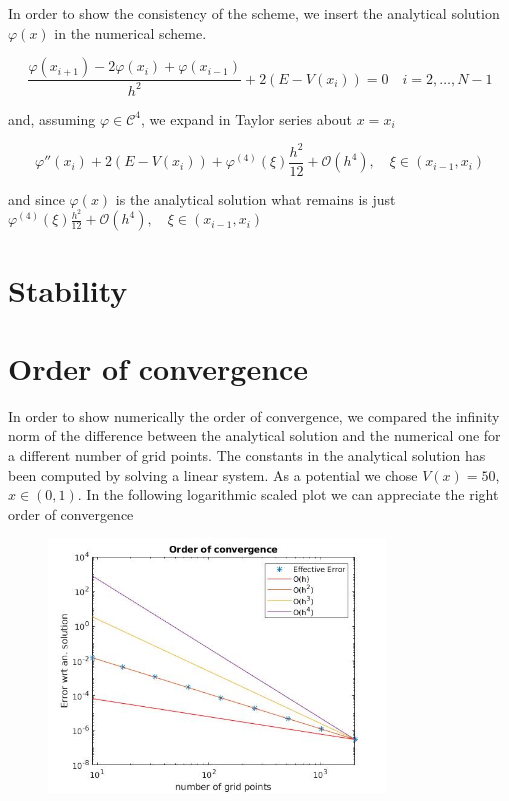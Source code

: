 \documentclass[a4paper,oneside]{book}
\theoremstyle{definition}
\theoremstyle{plain}
\newcommand{\var}{\varphi}
\begin{document}
In order to show the consistency of the scheme, we insert the analytical solution $\var(x)$ in the numerical scheme.

 \[ \frac{\var(x_{i+1})-2\var(x_i)+\var(x_{i-1})}{h^2}+2(E-V(x_i))=0 \quad i=2, \ldots, N-1 \]

and, assuming $\var \in \mathcal{C}^{4}$, we expand in Taylor series about $x=x_i$

\[ \var ''(x_i)+2(E-V(x_i))+ \var^{(4)}(\xi) \frac{h^2}{12}+\mathcal{O}(h^4), \quad \xi \in (x_{i-1},x_i)\]

and since $\var(x)$ is the analytical solution what remains is just $ \var^{(4)}(\xi) \frac{h^2}{12}+\mathcal{O}(h^4), \quad \xi \in (x_{i-1},x_i)$

\section{Stability}







\section{Order of convergence}

In order to show numerically the order of convergence, we compared the infinity norm of the difference between the analytical solution and the numerical one for a different number of grid points. The constants in the analytical solution has been computed by solving a linear system. 
As a potential we chose  $V(x)=50$, $ x \in (0,1)$. In the following logarithmic scaled plot we can appreciate the right order of convergence 
\begin{figure}[h]
	 \centering
	  \includegraphics[width=0.8\textwidth]{OrderConst.jpg}
\end{figure}
\end{document}
